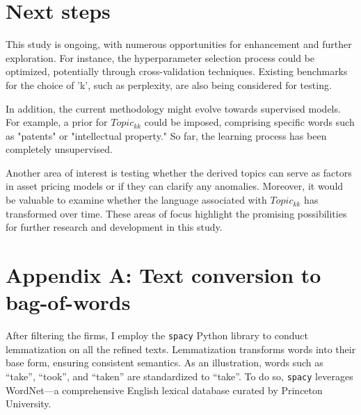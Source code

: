 \documentclass[12pt, letterpaper]{article}
\begin{document}

\section{Next steps}

This study is ongoing, with numerous opportunities for enhancement and further exploration. For instance, the hyperparameter selection process could be optimized, potentially through cross-validation techniques. Existing benchmarks for the choice of 'k', such as perplexity, are also being considered for testing.

In addition, the current methodology might evolve towards supervised models. For example, a prior for $Topic_{kk}$ could be imposed, comprising specific words such as "patents" or "intellectual property." So far, the learning process has been completely unsupervised.

Another area of interest is testing whether the derived topics can serve as factors in asset pricing models or if they can clarify any anomalies. Moreover, it would be valuable to examine whether the language associated with $Topic_{kk}$ has transformed over time. These areas of focus highlight the promising possibilities for further research and development in this study.

%
%
%
%
%



\section*{Appendix A: Text conversion to bag-of-words}

After filtering the firms, I employ the \texttt{spacy} Python library to conduct lemmatization on all the refined texts. Lemmatization transforms words into their base form, ensuring consistent semantics. As an illustration, words such as ``take'', ``took'', and ``taken'' are standardized to ``take''. To do so, \texttt{spacy} leverages WordNet---a comprehensive English lexical database curated by Princeton University.
\end{document}

